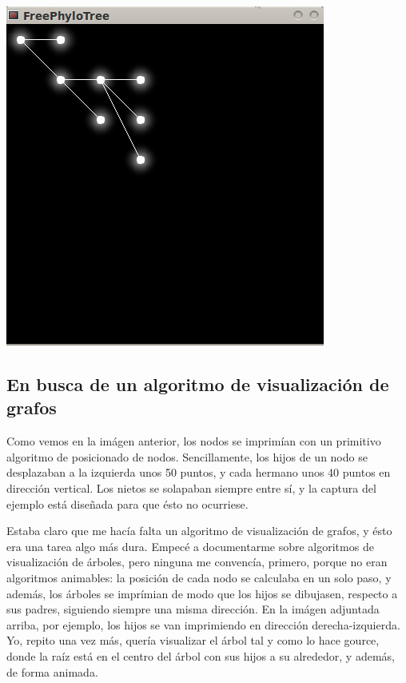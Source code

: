 \begin{center}
\includegraphics[scale=.65]{images/arbolBlur.png}
\end{center}

\subsection{En busca de un algoritmo de visualización de grafos}
Como vemos en la imágen anterior, los nodos se imprimían con un
primitivo algoritmo de posicionado de nodos. Sencillamente, los hijos
de un nodo se desplazaban a la izquierda unos 50 puntos, y cada
hermano unos 40 puntos en dirección vertical. Los nietos se solapaban
siempre entre sí, y la captura del ejemplo está diseñada para que ésto
no ocurriese.

Estaba claro que me hacía falta un algoritmo de visualización de
grafos, y ésto era una tarea algo más dura. Empecé a documentarme
sobre algoritmos de visualización de árboles, pero ninguna me
convencía, primero, porque no eran algoritmos animables: la posición
de cada nodo se calculaba en un solo paso, y además, los árboles se
imprímian de modo que los hijos se dibujasen, respecto a sus padres,
siguiendo siempre una misma dirección. En la imágen adjuntada arriba, por
ejemplo, los hijos se van imprimiendo en dirección
derecha-izquierda. Yo, repito una vez más, quería visualizar el árbol
tal y como lo hace gource, donde la raíz está en el centro del árbol
con sus hijos a su alrededor, y además, de forma animada.

